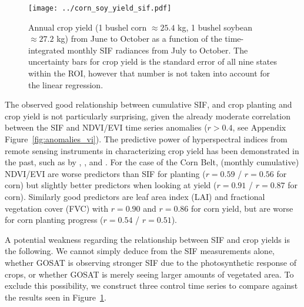 \documentclass[preprint, a4paper, 10pt, times]{elsarticle}
\begin{document}
\begin{figure}[htbp]
\centering
\texttt{[image: ../corn\_soy\_yield\_sif.pdf]}
\caption{Annual crop yield (1 bushel corn $\approx 25.4$ kg, 1 bushel soybean $\approx 27.2$ kg) from June to October as a function of the time-integrated monthly SIF radiances from July to October. The uncertainty bars for crop yield is the standard error of all nine states within the ROI, however that number is not taken into account for the linear regression.}
\label{fig:corn_soy_yield_sif}
\end{figure}

The observed good relationship between cumulative SIF, and crop planting and crop yield is not particularly surprising, given the already moderate correlation between the SIF and NDVI/EVI time series anomalies ($r > 0.4$, see Appendix Figure~\ref{fig:anomalies_vi}). The predictive power of hyperspectral indices from remote sensing instruments in characterizing crop yield has been demonstrated in the past, such as by \citet{Shanahan2001}, \citet{Prasad2006}, \citet{Beckerreshef2010} and \citet{Mkhabela2011}. For the case of the Corn Belt, (monthly cumulative) NDVI/EVI are worse predictors than SIF for planting ($r = 0.59$ / $r = 0.56$ for corn) but slightly better predictors when looking at yield ($r = 0.91$ / $r = 0.87$ for corn). Similarly good predictors are leaf area index (LAI) and fractional vegetation cover (FVC) with $r = 0.90$ and $r = 0.86$ for corn yield, but are worse for corn planting progress ($r = 0.54$ / $r = 0.51$).

A potential weakness regarding the relationship between SIF and crop yields is the following. We cannot simply deduce from the SIF measurements alone, whether GOSAT is observing stronger SIF due to the photosynthetic response of crops, or whether GOSAT is merely seeing larger amounts of vegetated area. To exclude this possibility, we construct three control time series to compare against the results seen in Figure~\ref{fig:corn_soy_yield_sif}.
\end{document}
